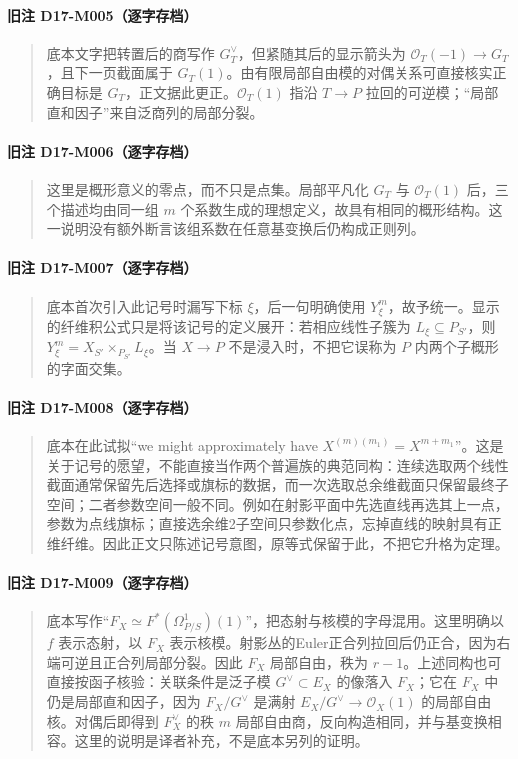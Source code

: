 \documentclass[UTF8,a4paper]{ctexbook}
\begin{document}
\paragraph*{旧注 D17-M005（逐字存档）}
\begin{quote}
底本文字把转置后的商写作 $G_T^\vee$，但紧随其后的显示箭头为 $\mathcal O_T(-1)\to G_T$，且下一页截面属于 $G_T(1)$。由有限局部自由模的对偶关系可直接核实正确目标是 $G_T$，正文据此更正。$\mathcal O_T(1)$ 指沿 $T\to P$ 拉回的可逆模；“局部直和因子”来自泛商列的局部分裂。
\end{quote}

\paragraph*{旧注 D17-M006（逐字存档）}
\begin{quote}
这里是概形意义的零点，而不只是点集。局部平凡化 $G_T$ 与 $\mathcal O_T(1)$ 后，三个描述均由同一组 $m$ 个系数生成的理想定义，故具有相同的概形结构。这一说明没有额外断言该组系数在任意基变换后仍构成正则列。
\end{quote}

\paragraph*{旧注 D17-M007（逐字存档）}
\begin{quote}
底本首次引入此记号时漏写下标 $\xi$，后一句明确使用 $Y^m_\xi$，故予统一。显示的纤维积公式只是将该记号的定义展开：若相应线性子簇为 $L_\xi\subseteq P_{S'}$，则 $Y^m_\xi=X_{S'}\times_{P_{S'}}L_\xi$。当 $X\to P$ 不是浸入时，不把它误称为 $P$ 内两个子概形的字面交集。
\end{quote}

\paragraph*{旧注 D17-M008（逐字存档）}
\begin{quote}
底本在此试拟“we might approximately have $X^{(m)(m_1)}=X^{m+m_1}$”。这是关于记号的愿望，不能直接当作两个普遍族的典范同构：连续选取两个线性截面通常保留先后选择或旗标的数据，而一次选取总余维截面只保留最终子空间；二者参数空间一般不同。例如在射影平面中先选直线再选其上一点，参数为点线旗标；直接选余维2子空间只参数化点，忘掉直线的映射具有正维纤维。因此正文只陈述记号意图，原等式保留于此，不把它升格为定理。
\end{quote}

\paragraph*{旧注 D17-M009（逐字存档）}
\begin{quote}
底本写作“$F_X\simeq F^*(\Omega^1_{P/S})(1)$”，把态射与核模的字母混用。这里明确以 $f$ 表示态射，以 $F_X$ 表示核模。射影丛的Euler正合列拉回后仍正合，因为右端可逆且正合列局部分裂。因此 $F_X$ 局部自由，秩为 $r-1$。上述同构也可直接按函子核验：关联条件是泛子模 $G^\vee\subset E_X$ 的像落入 $F_X$；它在 $F_X$ 中仍是局部直和因子，因为 $F_X/G^\vee$ 是满射 $E_X/G^\vee\to\mathcal O_X(1)$ 的局部自由核。对偶后即得到 $F_X^\vee$ 的秩 $m$ 局部自由商，反向构造相同，并与基变换相容。这里的说明是译者补充，不是底本另列的证明。
\end{quote}
\end{document}
